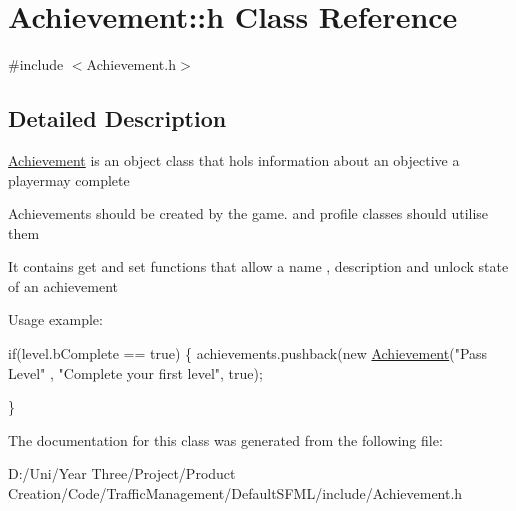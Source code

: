\hypertarget{class_achievement_1_1h}{}\section{Achievement\+:\+:h Class Reference}
\label{class_achievement_1_1h}


{\ttfamily \#include $<$Achievement.\+h$>$}



\subsection{Detailed Description}
\hyperlink{class_achievement}{Achievement} is an object class that hols information about an objective a playermay complete

Achievements should be created by the game. and profile classes should utilise them

It contains get and set functions that allow a name , description and unlock state of an achievement

Usage example\+: 
\begin{DoxyCode}
\textcolor{keywordflow}{if}(level.bComplete == \textcolor{keyword}{true})
\{
     achievements.pushback(\textcolor{keyword}{new} \hyperlink{class_achievement_acea9a90b8128628e1bddc45a83afaa99}{Achievement}(\textcolor{stringliteral}{"Pass Level"} , \textcolor{stringliteral}{"Complete your first level"}, \textcolor{keyword}{true});

\}
\end{DoxyCode}
 

The documentation for this class was generated from the following file\+:\begin{DoxyCompactItemize}
\item 
D\+:/\+Uni/\+Year Three/\+Project/\+Product Creation/\+Code/\+Traffic\+Management/\+Default\+S\+F\+M\+L/include/Achievement.\+h\end{DoxyCompactItemize}
